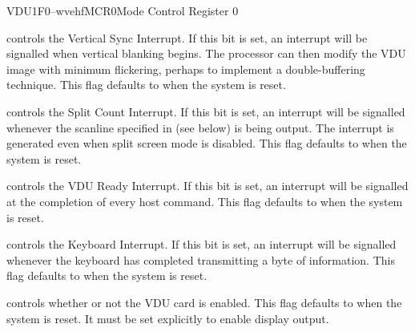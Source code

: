 \begin{ioport}{VDU}{1F0}{--wvehf}{MCR0}{Mode Control Register 0}
\begin{description}
     controls the Vertical Sync Interrupt. If this bit is set,
    an interrupt will be signalled when vertical blanking begins. The processor
    can then modify the VDU image with minimum flickering, perhaps to implement
    a double-buffering technique. This flag defaults to  when the system
    is reset.
    
     controls the Split Count Interrupt. If this bit is set, an
    interrupt will be signalled whenever the scanline specified in 
    (see below) is being output. The interrupt is generated even when split
    screen mode is disabled. This flag defaults to  when the system is reset.

     controls the VDU Ready Interrupt. If this bit is set, an
    interrupt will be signalled at the completion of every host command.  This
    flag defaults to  when the system is reset.

     controls the Keyboard Interrupt. If this bit is set, an
    interrupt will be signalled whenever the keyboard has completed
    transmitting a byte of information. This flag defaults to  when the
    system is reset.

     controls whether or not the VDU card is enabled. This
    flag defaults to  when the system is reset. It must be set
    explicitly to enable display output.

  \end{description}

\end{ioport}



